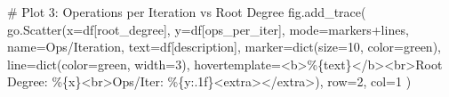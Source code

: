 \documentclass[
  letterpaper,
  DIV=11,
  numbers=noendperiod]{scrartcl}
\newenvironment{Shaded}{\begin{snugshade}}{\end{snugshade}}
\newcommand{\BuiltInTok}[1]{\textcolor[rgb]{0.00,0.23,0.31}{#1}}
\newcommand{\CommentTok}[1]{\textcolor[rgb]{0.37,0.37,0.37}{#1}}
\newcommand{\DecValTok}[1]{\textcolor[rgb]{0.68,0.00,0.00}{#1}}
\newcommand{\NormalTok}[1]{\textcolor[rgb]{0.00,0.23,0.31}{#1}}
\newcommand{\OperatorTok}[1]{\textcolor[rgb]{0.37,0.37,0.37}{#1}}
\newcommand{\SpecialCharTok}[1]{\textcolor[rgb]{0.37,0.37,0.37}{#1}}
\newcommand{\StringTok}[1]{\textcolor[rgb]{0.13,0.47,0.30}{#1}}
\begin{document}
\begin{Shaded}
\begin{Highlighting}[]
\CommentTok{\# Plot 3: Operations per Iteration vs Root Degree}
\NormalTok{fig.add\_trace(}
\NormalTok{    go.Scatter(x}\OperatorTok{=}\NormalTok{df[}\StringTok{\textquotesingle{}root\_degree\textquotesingle{}}\NormalTok{], y}\OperatorTok{=}\NormalTok{df[}\StringTok{\textquotesingle{}ops\_per\_iter\textquotesingle{}}\NormalTok{],}
\NormalTok{               mode}\OperatorTok{=}\StringTok{\textquotesingle{}markers+lines\textquotesingle{}}\NormalTok{,}
\NormalTok{               name}\OperatorTok{=}\StringTok{\textquotesingle{}Ops/Iteration\textquotesingle{}}\NormalTok{,}
\NormalTok{               text}\OperatorTok{=}\NormalTok{df[}\StringTok{\textquotesingle{}description\textquotesingle{}}\NormalTok{],}
\NormalTok{               marker}\OperatorTok{=}\BuiltInTok{dict}\NormalTok{(size}\OperatorTok{=}\DecValTok{10}\NormalTok{, color}\OperatorTok{=}\StringTok{\textquotesingle{}green\textquotesingle{}}\NormalTok{),}
\NormalTok{               line}\OperatorTok{=}\BuiltInTok{dict}\NormalTok{(color}\OperatorTok{=}\StringTok{\textquotesingle{}green\textquotesingle{}}\NormalTok{, width}\OperatorTok{=}\DecValTok{3}\NormalTok{),}
\NormalTok{               hovertemplate}\OperatorTok{=}\StringTok{\textquotesingle{}\textless{}b\textgreater{}\%}\SpecialCharTok{\{text\}}\StringTok{\textless{}/b\textgreater{}\textless{}br\textgreater{}Root Degree: \%}\SpecialCharTok{\{x\}}\StringTok{\textless{}br\textgreater{}Ops/Iter: \%}\SpecialCharTok{\{y:.1f\}}\StringTok{\textless{}extra\textgreater{}\textless{}/extra\textgreater{}\textquotesingle{}}\NormalTok{),}
\NormalTok{    row}\OperatorTok{=}\DecValTok{2}\NormalTok{, col}\OperatorTok{=}\DecValTok{1}
\NormalTok{)}


\end{Highlighting}
\end{Shaded}
\end{document}
